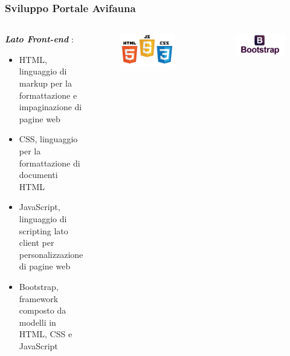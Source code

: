 \documentclass{beamer}
\def \sv {Sviluppo Portale Avifauna}
\def \js {JavaScript}
\begin{document}
\begin{frame}
 \frametitle{\sv}
 \begin{center}
  \begin{columns}
   \begin{center}
    \textbf{\emph{Lato Front-end}} : \\[0.5cm]
    \begin{itemize}
     \item HTML, linguaggio di markup per la formattazione e impaginazione di pagine web
     \item CSS, linguaggio per la formattazione di documenti HTML
     \item JavaScript, linguaggio di scripting lato client per personalizzazione di pagine web
     \item Bootstrap, framework composto da modelli in HTML, CSS e {\js}
    \end{itemize}
   \end{center}
   \begin{figure}
     \includegraphics[scale=0.25]{images/html5-js-css3}
   \end{figure}
   \begin{figure}
     \includegraphics[scale=0.3]{images/bootstrap}
   \end{figure}
  \end{columns}
 \end{center}
\end{frame}
\end{document}
